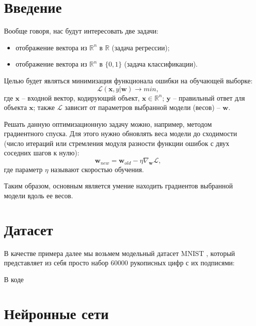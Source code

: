 \documentclass[12pt, oneside, a4paper, openany]{scrarticle}
\begin{document}
\section{Введение}


Вообще говоря, нас будут интересовать две задачи:
\begin{itemize}
	\item отображение вектора из $\mathbb{R}^{n}$ в $\mathbb{R}$ (задача регрессии);
	\item отображение вектора из $\mathbb{R}^{n}$ в $\{0,1\}$ (задача классификации).
\end{itemize}

Целью будет являться минимизация функционала ошибки на обучающей выборке:
\begin{equation}
	\mathscr{L}(\bm{x}, y | \bm{w}) \to min,
\end{equation}
где $\bm{x}$ -- входной вектор, кодирующий объект, $\bm{x} \in \mathbb{R}^n$; $\bm{y}$ -- правильный ответ для объекта $\bm{x}$; также $\mathscr{L}$ зависит от параметров выбранной модели (весов) -- $\bm{w}$.

Решать данную оптимизационную задачу можно, например, методом градиентного спуска. Для этого нужно обновлять веса модели до сходимости (число итераций или стремления модуля разности функции ошибок с двух соседних шагов к нулю):
\begin{equation}
	\bm{w}_{new} = \bm{w}_{old} - \eta \nabla_{\bm{w}} \mathscr{L},
\end{equation}
где параметр $\eta$ называют скоростью обучения.

Таким образом, основным является умение находить градиентов выбранной модели вдоль ее весов.

\section{Датасет}
В качестве примера далее мы возьмем модельный датасет MNIST \cite{LeCun1998}, который представляет из себя просто набор 60000 рукописных цифр с их подписями:


В коде 



\section{Нейронные сети}
\end{document}
